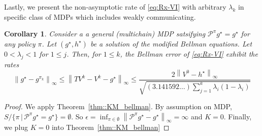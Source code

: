 \documentclass{article} %
\newcommand{\cP}{\mathcal{P}}
\newcommand*{\infn}[1]{\left\|{#1}\right\|_{\infty}}
\newtheorem{corollary}{Corollary}
\begin{document}
Lastly, we present the non-asymptotic rate of \ref{eq:Rx-VI} with arbitrary $\lambda_k$ in specific class of MDPs which includes weakly communicating.  

\begin{corollary}\label{cor::Bellman_weakly_Rx}
 Consider a a general (multichain) MDP satsifying $\cP^{\pi}g^{\star}=g^{\star}$ for any policy $\pi$. Let $(g^{\star},h^{\star})$ be a solution of the modified Bellman equations. Let $0<\lambda_j<1$ for $1 \le j$. Then, for $1 \le k$, the Bellman error of \ref{eq:Rx-VI} exhibit the rates
    \[\infn{g^{\star}-g^{\pi_k}}  \le \infn{TV^k-V^k-g^{\star}} \le \frac{2\infn{V^0-h^{\star}}}{\sqrt{(3.141592\dots)\sum^{k}_{j=1} \lambda_i(1-\lambda_{i})}}\]
\end{corollary}
\begin{proof}
We apply Theorem~\ref{thm::KM_bellman}. By assumption on MDP, $ S / \{\pi \,|\,\cP^{\pi}g^{\star} =  g^{\star}\} = \emptyset$. So $\epsilon=\inf_{\pi \in \emptyset} \infn{\cP^{\pi}g^{\star}-g^{\star}} = \infty$ and $K=0$. Finally, we plug $K=0$ into Theorem~\ref{thm::KM_bellman}
\end{proof}


\vspace{0.1in}
\end{document}

